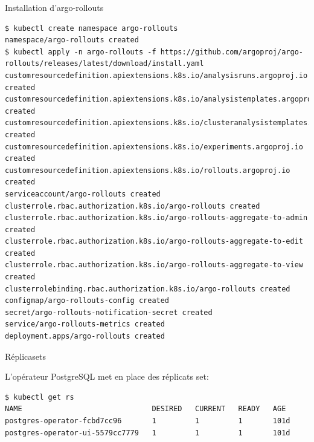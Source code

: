 \begin{frame}[fragile]{Installation d'argo-rollouts}

\begin{tiny}
\begin{Verbatim}[commandchars=\&\#\#]
$ kubectl create namespace argo-rollouts
namespace/argo-rollouts created
$ kubectl apply -n argo-rollouts -f https://github.com/argoproj/argo-rollouts/releases/latest/download/install.yaml
customresourcedefinition.apiextensions.k8s.io/analysisruns.argoproj.io created
customresourcedefinition.apiextensions.k8s.io/analysistemplates.argoproj.io created
customresourcedefinition.apiextensions.k8s.io/clusteranalysistemplates.argoproj.io created
customresourcedefinition.apiextensions.k8s.io/experiments.argoproj.io created
customresourcedefinition.apiextensions.k8s.io/rollouts.argoproj.io created
serviceaccount/argo-rollouts created
clusterrole.rbac.authorization.k8s.io/argo-rollouts created
clusterrole.rbac.authorization.k8s.io/argo-rollouts-aggregate-to-admin created
clusterrole.rbac.authorization.k8s.io/argo-rollouts-aggregate-to-edit created
clusterrole.rbac.authorization.k8s.io/argo-rollouts-aggregate-to-view created
clusterrolebinding.rbac.authorization.k8s.io/argo-rollouts created
configmap/argo-rollouts-config created
secret/argo-rollouts-notification-secret created
service/argo-rollouts-metrics created
deployment.apps/argo-rollouts created
\end{Verbatim}
\end{tiny}

\end{frame}


\begin{frame}[fragile]{Réplicasets}

   L'opérateur PostgreSQL met en place des réplicats set:
\begin{tiny}
\begin{Verbatim}[commandchars=\&\#\#]
$ kubectl get rs
NAME                              DESIRED   CURRENT   READY   AGE
postgres-operator-fcbd7cc96       1         1         1       101d
postgres-operator-ui-5579cc7779   1         1         1       101d
\end{Verbatim}
\end{tiny}

\end{frame}


